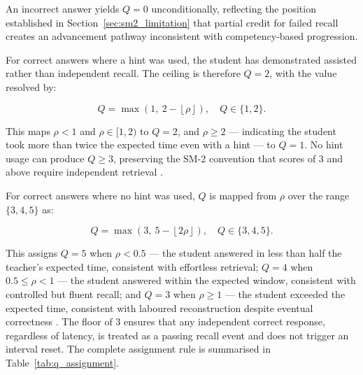 An incorrect answer yields $Q = 0$ unconditionally, reflecting the position established in Section~\ref{sec:sm2_limitation} that partial credit for failed recall creates an advancement pathway inconsistent with competency-based progression.

For correct answers where a hint was used, the student has demonstrated assisted rather than independent recall. The ceiling is therefore $Q = 2$, with the value resolved by:

\begin{equation}
Q = \max\!\left(1,\ 
    2 - \left\lfloor \rho \right\rfloor
\right), \quad Q \in \{1, 2\}.
\end{equation}

This maps $\rho < 1$ and $\rho \in [1, 2)$ to $Q = 2$, and $\rho \geq 2$ — indicating the student took more than twice the expected time even with a hint — to $Q = 1$. No hint usage can produce $Q \geq 3$, preserving the SM-2 convention that scores of 3 and above require independent retrieval \cite{wozniak1998sm2}.

For correct answers where no hint was used, $Q$ is mapped from $\rho$ over the range $\{3, 4, 5\}$ as:

\begin{equation}
Q = \max\!\left(3,\ 
    5 - \left\lfloor 2\rho \right\rfloor
\right), \quad Q \in \{3, 4, 5\}.
\end{equation}

This assigns $Q = 5$ when $\rho < 0.5$ — the student answered in less than half the teacher's expected time, consistent with effortless retrieval; $Q = 4$ when $0.5 \leq \rho < 1$ — the student answered within the expected window, consistent with controlled but fluent recall; and $Q = 3$ when $\rho \geq 1$ — the student exceeded the expected time, consistent with laboured reconstruction despite eventual correctness \cite{benjamin1996}. The floor of 3 ensures that any independent correct response, regardless of latency, is treated as a passing recall event and does not trigger an interval reset. The complete assignment rule is summarised in Table~\ref{tab:q_assignment}.

